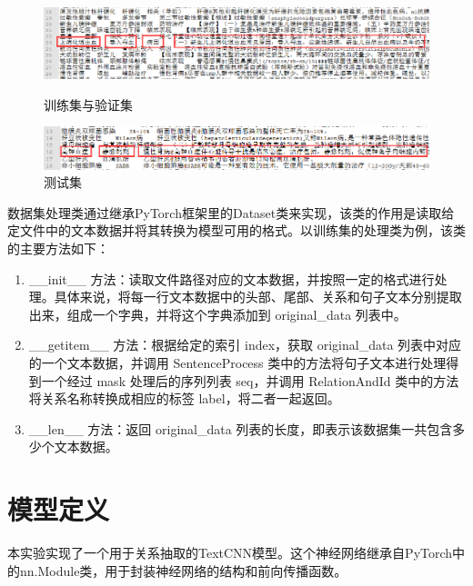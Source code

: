 \documentclass{report}
\begin{document}
	\begin{figure}[htbp]
		\centering
		\begin{minipage}[t]{1.0\textwidth}
			\centering
			\centering
			\includegraphics[width=1.0\textwidth]{fig/traindata.png}
			\caption{训练集与验证集}
			\label{fig:train}
		\end{minipage}
		
		\begin{minipage}[t]{1.0\textwidth}
			\centering
			\includegraphics[width=1.0\textwidth]{fig/testdata.png}
			\caption{测试集}
			\label{fig:test}
		\end{minipage}
	\end{figure}
	
	数据集处理类通过继承PyTorch框架里的Dataset类来实现，该类的作用是读取给定文件中的文本数据并将其转换为模型可用的格式。以训练集的处理类为例，该类的主要方法如下：
	\begin{enumerate}
		\item \_\_init\_\_ 方法：读取文件路径对应的文本数据，并按照一定的格式进行处理。具体来说，将每一行文本数据中的头部、尾部、关系和句子文本分别提取出来，组成一个字典，并将这个字典添加到 original\_data 列表中。
		
		\item \_\_getitem\_\_ 方法：根据给定的索引 index，获取 original\_data 列表中对应的一个文本数据，并调用 SentenceProcess 类中的方法将句子文本进行处理得到一个经过 mask 处理后的序列列表 seq，并调用 RelationAndId 类中的方法将关系名称转换成相应的标签 label，将二者一起返回。
		\item \_\_len\_\_ 方法：返回 original\_data 列表的长度，即表示该数据集一共包含多少个文本数据。
	\end{enumerate}
	
	
	\section{模型定义}
	本实验实现了一个用于关系抽取的TextCNN模型。这个神经网络继承自PyTorch中的nn.Module类，用于封装神经网络的结构和前向传播函数。
	
\end{document}
